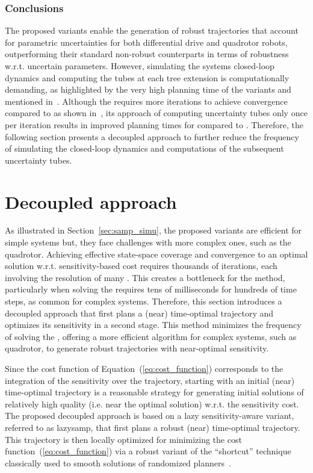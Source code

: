 \subsubsection{Conclusions}

The proposed  variants enable the generation of robust trajectories that account for parametric uncertainties for both differential drive and quadrotor robots, outperforming their standard non-robust counterparts in terms of robustness w.r.t. uncertain parameters.
However, simulating the systems closed-loop dynamics and computing the tubes at each tree extension is computationally demanding, as highlighted by the very high planning time of the  variants and mentioned in~\cite{cTognon}.
Although the  requires more iterations to achieve convergence compared to  as shown in~\cite{cSST}, its approach of computing uncertainty tubes only once per iteration results in improved planning times for  compared to .
Therefore, the following section presents a decoupled approach to further reduce the frequency of simulating the closed-loop dynamics and computations of the subsequent uncertainty tubes.

\section{Decoupled approach}\label{sec:decoupled}

As illustrated in Section~\ref{sec:samp_simu}, the proposed  variants are efficient for simple systems but, they face challenges with more complex ones, such as the quadrotor. 
Achieving effective state-space coverage and convergence to an optimal solution w.r.t. sensitivity-based cost requires thousands of iterations, each involving the resolution of many . 
This creates a bottleneck for the method, particularly when solving the  requires tens of milliseconds for hundreds of time steps, as common for complex systems.
Therefore, this section introduces a decoupled approach that first plans a (near) time-optimal trajectory and optimizes its sensitivity in a second stage.
This method minimizes the frequency of solving the , offering a more efficient algorithm for complex systems, such as quadrotor, to generate robust trajectories with near-optimal sensitivity.

Since the cost function of Equation~(\ref{eq:cost_function}) corresponds to the integration of the sensitivity over the trajectory, starting with an initial (near) time-optimal trajectory is a reasonable strategy for generating initial solutions of relatively high quality (i.e. near the optimal solution) w.r.t. the sensitivity cost.
The proposed decoupled approach is based on a lazy sensitivity-aware variant, referred to as \gls{lazysamp}, that first plans a robust (near) time-optimal trajectory.
This trajectory is then locally optimized for minimizing the cost function~(\ref{eq:cost_function}) via a robust variant of the ``shortcut'' technique classically used to smooth solutions of randomized planners~\cite{cShortcut}. 

